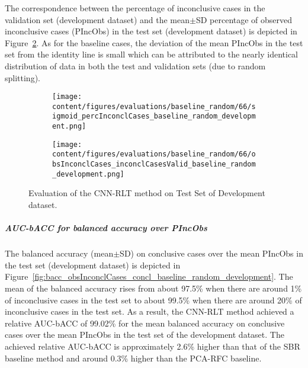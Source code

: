 The correspondence between the percentage of inconclusive cases in the validation set (development dataset) and 
the mean$\pm$SD percentage of observed inconclusive cases (PIncObs) in the test set (development dataset) 
is depicted in Figure~\ref{fig:obsInconclCases_inconclCasesValid_baseline_random_development}.
As for the baseline cases, the deviation of the mean PIncObs in the test set from the 
identity line is small which can be attributed to the nearly identical distribution of data in both the test and validation sets 
(due to random splitting).


\begin{figure}[ht]
  \begin{subfigure}{0.48\textwidth}
    \centering
    \texttt{[image: content/figures/evaluations/baseline\_random/66/sigmoid\_percInconclCases\_baseline\_random\_development.png]}
    \label{fig:baseline_random_percInconclCases_development}
  \end{subfigure}
  \hfill
  \begin{subfigure}{0.495\textwidth}
    \centering
    \texttt{[image: content/figures/evaluations/baseline\_random/66/obsInconclCases\_inconclCasesValid\_baseline\_random\_development.png]}
    \label{fig:obsInconclCases_inconclCasesValid_baseline_random_development}
  \end{subfigure}

  \caption{Evaluation of the CNN-RLT method on Test Set of Development dataset.}
  \label{fig:eval_cnn_rlt_dev}
\end{figure}


\subparagraph{AUC-bACC for balanced accuracy over PIncObs}

The balanced accuracy (mean$\pm$SD) on conclusive cases over the mean PIncObs in the test set (development dataset) 
is depicted in Figure~\ref{fig:bacc_obsInconclCases_concl_baseline_random_development}.
The mean of the balanced accuracy rises from about 97.5\% 
when there are around 1\% of inconclusive cases in the test set to about 99.5\% 
when there are around 20\% of inconclusive cases in the test set.
As a result, the CNN-RLT method achieved a relative AUC-bACC of 99.02\% for the mean balanced accuracy on conclusive cases
over the mean PIncObs in the test set of the development dataset.
The achieved relative AUC-bACC is approximately 2.6\% higher than that of the SBR baseline method 
and around 0.3\% higher than the PCA-RFC baseline.



